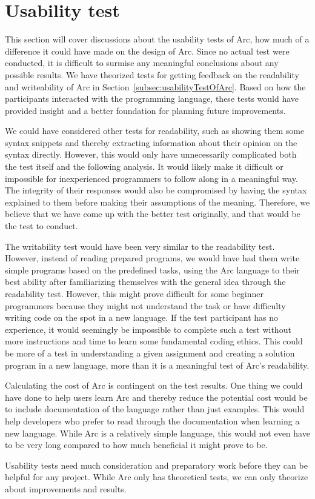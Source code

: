 \section{Usability test}\label{sec:discussion_usabilityTest}

This section will cover discussions about the usability tests of Arc, how much of a difference it could have made on the design of Arc. Since no actual test were conducted, it is difficult to surmise any meaningful conclusions about any possible results. We have theorized tests for getting feedback on the readability and writeability of Arc in Section~\ref{subsec:usabilityTestOfArc}. Based on how the participants interacted with the programming language, these tests would have provided insight and a better foundation for planning future improvements.

We could have considered other tests for readability, such as showing them some syntax snippets and thereby extracting information about their opinion on the syntax directly. However, this would only have unnecessarily complicated both the test itself and the following analysis. It would likely make it difficult or impossible for inexperienced programmers to follow along in a meaningful way. The integrity of their responses would also be compromised by having the syntax explained to them before making their assumptions of the meaning. Therefore, we believe that we have come up with the better test originally, and that would be the test to conduct.

The writability test would have been very similar to the readability test. However, instead of reading prepared programs, we would have had them write simple programs based on the predefined tasks, using the Arc language to their best ability after familiarizing themselves with the general idea through the readability test. However, this might prove difficult for some beginner programmers because they might not understand the task or have difficulty writing code on the spot in a new language. If the test participant has no experience, it would seemingly be impossible to complete such a test without more instructions and time to learn some fundamental coding ethics. This could be more of a test in understanding a given assignment and creating a solution program in a new language, more than it is a meaningful test of Arc's readability.

Calculating the cost of Arc is contingent on the test results. One thing we could have done to help users learn Arc and thereby reduce the potential cost would be to include documentation of the language rather than just examples. This would help developers who prefer to read through the documentation when learning a new language. While Arc is a relatively simple language, this would not even have to be very long compared to how much beneficial it might prove to be.

Usability tests need much consideration and preparatory work before they can be helpful for any project. While Arc only has theoretical tests, we can only theorize about improvements and results. 